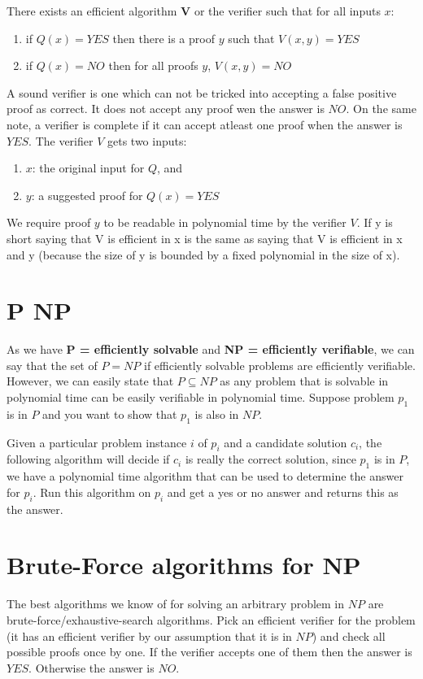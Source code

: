 There exists an efficient algorithm $\textbf{V}$ or the verifier such that for all inputs $x$:
\begin{enumerate}[nolistsep]
    \item if $Q(x) = YES$ then there is a proof $y$ such that $V(x,y) = YES$
    \item if $Q(x) = NO$ then for all proofs $y$, $V(x,y) = NO$
\end{enumerate}

A sound verifier is one which can not be tricked into accepting a false positive proof as correct. It does not accept any proof wen the answer is $NO$. On the same note, a verifier is complete if it can accept atleast one proof when the answer is $YES$. The verifier $V$ gets two inputs:

\begin{enumerate}[nolistsep]
    \item $x$: the original input for $Q$, and
    \item $y$: a suggested proof for $Q(x) = YES$
\end{enumerate}

We require proof $y$ to be readable in polynomial time by the verifier $V$. If y is short saying that V is efficient in x is the same as saying that V is efficient in x and y (because the size of y is bounded by a fixed polynomial in the size of x).

\section{P \subseteq NP}
As we have \textbf{P = efficiently solvable} and \textbf{NP = efficiently verifiable}, we can say that the set of $P = NP$ if efficiently solvable problems are efficiently verifiable. However, we can easily state that $P \subseteq NP$ as any problem that is solvable in polynomial time can be easily verifiable in polynomial time. Suppose problem $p_1$ is in $P$ and you want to show that $p_1$ is also in $NP$.

Given a particular problem instance $i$ of $p_i$ and a candidate solution $c_i$, the following algorithm will decide if $c_i$ is really the correct solution, since $p_1$ is in $P$, we have a polynomial time algorithm that can be used to determine the answer for $p_i$. Run this algorithm on $p_i$ and get a yes or no answer and returns this as the answer.

\section{Brute-Force algorithms for NP}
The best algorithms we know of for solving an arbitrary problem in $NP$ are brute-force/exhaustive-search algorithms. Pick an efficient verifier for the problem (it has an efficient verifier by our assumption that it is in $NP$) and check all possible proofs once by one. If the verifier accepts one of them then the answer is $YES$. Otherwise the answer is $NO$.

